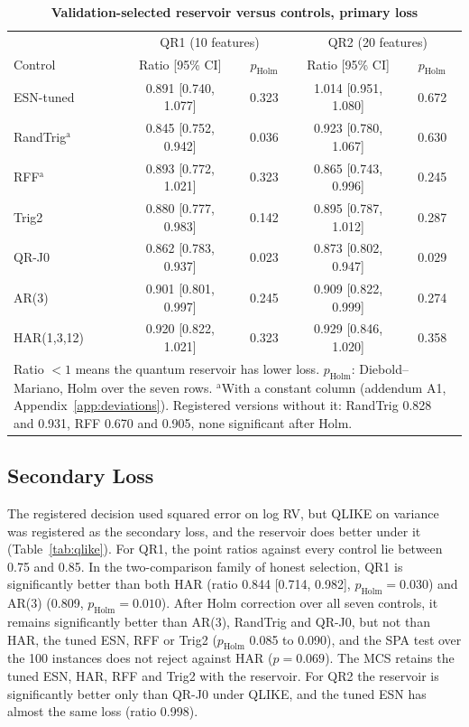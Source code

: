\documentclass{ieeeaccess}
\begin{document}
\begin{table}[t]
\caption{\textbf{Validation-selected reservoir versus controls, primary loss}}
\label{tab:controls}
\setlength{\tabcolsep}{2.5pt}
\begin{tabular}{|l|c|c|c|c|}
\hline
& \multicolumn{2}{c|}{QR1 (10 features)} & \multicolumn{2}{c|}{QR2 (20 features)}\\
Control & Ratio [95\% CI] & $p_\mathrm{Holm}$ & Ratio [95\% CI] & $p_\mathrm{Holm}$\\
\hline
ESN-tuned & 0.891 [0.740, 1.077] & 0.323 & 1.014 [0.951, 1.080] & 0.672\\
RandTrig$^\mathrm{a}$ & 0.845 [0.752, 0.942] & 0.036 & 0.923 [0.780, 1.067] & 0.630\\
RFF$^\mathrm{a}$ & 0.893 [0.772, 1.021] & 0.323 & 0.865 [0.743, 0.996] & 0.245\\
Trig2 & 0.880 [0.777, 0.983] & 0.142 & 0.895 [0.787, 1.012] & 0.287\\
QR-J0 & 0.862 [0.783, 0.937] & 0.023 & 0.873 [0.802, 0.947] & 0.029\\
AR(3) & 0.901 [0.801, 0.997] & 0.245 & 0.909 [0.822, 0.999] & 0.274\\
HAR(1,3,12) & 0.920 [0.822, 1.021] & 0.323 & 0.929 [0.846, 1.020] & 0.358\\
\hline
\multicolumn{5}{p{240pt}}{Ratio $<1$ means the quantum reservoir has lower loss. $p_\mathrm{Holm}$: Diebold--Mariano, Holm over the seven rows. $^\mathrm{a}$With a constant column (addendum A1, Appendix~\ref{app:deviations}). Registered versions without it: RandTrig 0.828 and 0.931, RFF 0.670 and 0.905, none significant after Holm.}\\
\end{tabular}
\end{table}

\subsection{Secondary Loss}
\label{sec:res-qlike}
The registered decision used squared error on log RV, but QLIKE on variance was registered as the secondary loss, and the reservoir does better under it (Table~\ref{tab:qlike}). For QR1, the point ratios against every control lie between 0.75 and 0.85. In the two-comparison family of honest selection, QR1 is significantly better than both HAR (ratio 0.844 [0.714, 0.982], $p_\mathrm{Holm}=0.030$) and AR(3) (0.809, $p_\mathrm{Holm}=0.010$). After Holm correction over all seven controls, it remains significantly better than AR(3), RandTrig and QR-J0, but not than HAR, the tuned ESN, RFF or Trig2 ($p_\mathrm{Holm}$ 0.085 to 0.090), and the SPA test over the 100 instances does not reject against HAR ($p=0.069$). The MCS retains the tuned ESN, HAR, RFF and Trig2 with the reservoir. For QR2 the reservoir is significantly better only than QR-J0 under QLIKE, and the tuned ESN has almost the same loss (ratio 0.998).
\end{document}
